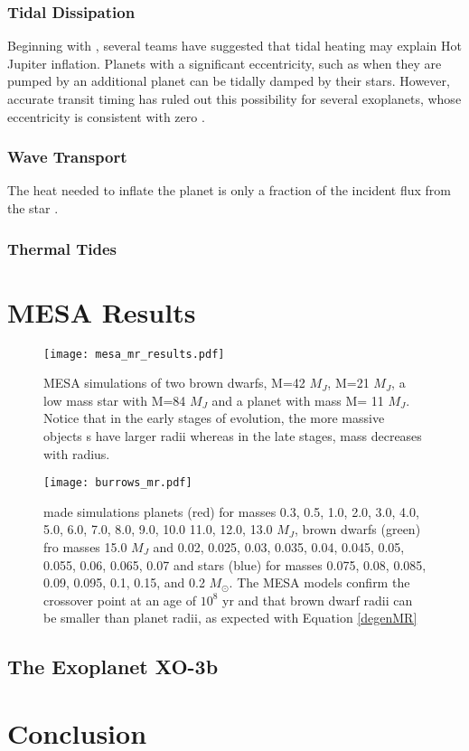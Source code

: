 \documentclass[twocolumn]{emulateapj}
\begin{document}
\subsubsection{Tidal Dissipation}
Beginning with \citet{bodenheimer01}, several teams have suggested
that tidal heating may explain Hot Jupiter inflation. Planets with a
significant eccentricity, such as when they are pumped by an
additional planet can be tidally damped by their stars. However,
accurate transit timing has ruled out this possibility for several
exoplanets, whose eccentricity is consistent with zero
\citet{forneyRev10}.
\subsubsection{Wave Transport}
The heat needed to inflate the planet is only a fraction of the incident flux from the star \citep{ibgui2010}.
\subsubsection{Thermal Tides}
\section{MESA Results}
\begin{figure*}[!htbp]
\begin{center}
\texttt{[image: mesa\_mr\_results.pdf]}
\caption{MESA simulations of two brown dwarfs, M=42 $M_J$, M=21 $M_J$,
 a low mass star with M=84 $M_J$ and a planet with mass M= 11 $M_J$.
  Notice that in the early stages of evolution, the more massive objects
  s have larger radii whereas in the late stages, mass decreases with radius.}
\label{mesaMR}
\end{center}
\end{figure*}


\begin{figure*}[!htbp]
\begin{center}
\texttt{[image: burrows\_mr.pdf]}
\caption{\citet{burrows2010} made simulations planets (red) for masses 0.3, 0.5, 1.0, 2.0, 3.0, 4.0, 5.0, 6.0, 7.0, 8.0, 9.0, 10.0 11.0, 12.0, 13.0 $M_J$, brown dwarfs (green) fro masses 15.0 $M_J$ and 0.02, 0.025, 0.03, 0.035, 0.04, 0.045, 0.05, 0.055, 0.06, 0.065, 0.07 and stars (blue) for masses 0.075, 0.08, 0.085, 0.09, 0.095, 0.1, 0.15, and 0.2 $M_\odot$. The MESA models confirm the crossover point at an age of $10^8$ yr and that brown dwarf radii can be smaller than planet radii, as expected with Equation \ref{degenMR}}
\label{burrowsMR}
\end{center}
\end{figure*}

\subsection{The Exoplanet XO-3b}
\section{Conclusion}

%
\end{document}
